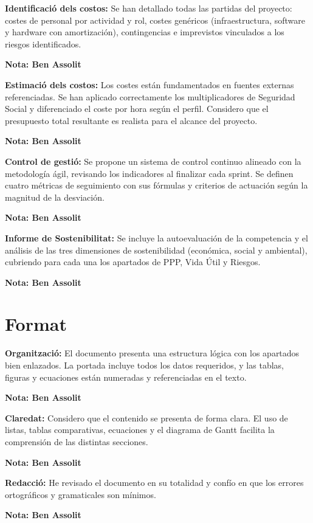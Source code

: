 \documentclass[12pt, a4paper]{article}
\begin{document}
\textbf{Identificació dels costos:} Se han detallado todas las partidas del proyecto: costes de personal por actividad y rol, costes genéricos (infraestructura, software y hardware con amortización), contingencias e imprevistos vinculados a los riesgos identificados.

\textbf{Nota: Ben Assolit}

\textbf{Estimació dels costos:} Los costes están fundamentados en fuentes externas referenciadas. Se han aplicado correctamente los multiplicadores de Seguridad Social y diferenciado el coste por hora según el perfil. Considero que el presupuesto total resultante es realista para el alcance del proyecto.

\textbf{Nota: Ben Assolit}

\textbf{Control de gestió:} Se propone un sistema de control continuo alineado con la metodología ágil, revisando los indicadores al finalizar cada sprint. Se definen cuatro métricas de seguimiento con sus fórmulas y criterios de actuación según la magnitud de la desviación.

\textbf{Nota: Ben Assolit}

\textbf{Informe de Sostenibilitat:} Se incluye la autoevaluación de la competencia y el análisis de las tres dimensiones de sostenibilidad (económica, social y ambiental), cubriendo para cada una los apartados de PPP, Vida Útil y Riesgos.

\textbf{Nota: Ben Assolit}

\section{Format}

\textbf{Organització:} El documento presenta una estructura lógica con los apartados bien enlazados. La portada incluye todos los datos requeridos, y las tablas, figuras y ecuaciones están numeradas y referenciadas en el texto.

\textbf{Nota: Ben Assolit}

\textbf{Claredat:} Considero que el contenido se presenta de forma clara. El uso de listas, tablas comparativas, ecuaciones y el diagrama de Gantt facilita la comprensión de las distintas secciones.

\textbf{Nota: Ben Assolit}

\textbf{Redacció:} He revisado el documento en su totalidad y confío en que los errores ortográficos y gramaticales son mínimos.

\textbf{Nota: Ben Assolit}
\end{document}

